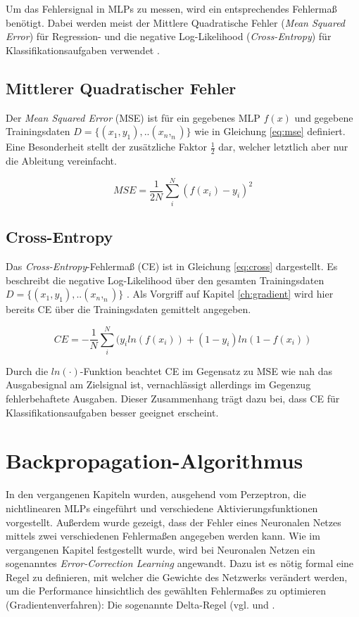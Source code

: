 Um das Fehlersignal in MLPs zu messen, wird ein entsprechendes Fehlermaß benötigt. Dabei werden meist der Mittlere Quadratische Fehler (\textit{Mean Squared Error}) für Regression- und die negative Log-Likelihood (\textit{Cross-Entropy}) für Klassifikationsaufgaben verwendet \cite[vgl.][]{Golik2013}. 

\subsection{Mittlerer Quadratischer Fehler}
Der \textit{Mean Squared Error} (MSE) ist für ein gegebenes MLP $f(x)$ und gegebene Trainingsdaten $D = \{(x_1,y_1),..(x_n,_n)\}$ wie in Gleichung \ref{eq:mse} definiert. Eine Besonderheit stellt der zusätzliche Faktor $\frac{1}{2}$ dar, welcher letztlich aber nur die Ableitung vereinfacht.

 	\begin{equation} 
 	\label{eq:mse}
   	MSE = \frac{1}{2N}\sum_{i}^{N}(f(x_i) - y_i)^2	
   	\end{equation}

\subsection{Cross-Entropy}
Das \textit{Cross-Entropy}-Fehlermaß (CE) ist in Gleichung \ref{eq:cross} dargestellt. Es beschreibt die negative Log-Likelihood über den gesamten Trainingsdaten $D = \{(x_1,y_1),..(x_n,_n)\}$ \cite[vgl.][S. 118]{Mitchell1997}. Als Vorgriff auf Kapitel \ref{ch:gradient} wird hier bereits CE über die Trainingsdaten gemittelt angegeben.

\begin{equation} 
 	\label{eq:cross}
   	CE = - \frac{1}{N}\sum_{i}^{N}(y_i ln(f(x_i)) + (1 - y_i) ln(1 - f(x_i))	
   	\end{equation}

Durch die $ln(\cdot)$-Funktion beachtet CE im Gegensatz zu MSE wie nah das Ausgabesignal am Zielsignal ist, vernachlässigt allerdings im Gegenzug fehlerbehaftete Ausgaben. Dieser Zusammenhang trägt dazu bei, dass CE für Klassifikationsaufgaben besser geeignet erscheint. 


\section{Backpropagation-Algorithmus}
\label{ch:backprop}
In den vergangenen Kapiteln wurden, ausgehend vom Perzeptron, die nichtlinearen MLPs eingeführt und verschiedene Aktivierungsfunktionen vorgestellt. Außerdem wurde gezeigt, dass der Fehler eines Neuronalen Netzes mittels zwei verschiedenen Fehlermaßen angegeben werden kann. Wie im vergangenen Kapitel festgestellt wurde, wird bei Neuronalen Netzen ein sogenanntes \textit{Error-Correction Learning} angewandt. Dazu ist es nötig formal eine Regel zu definieren, mit welcher die Gewichte des Netzwerks verändert werden, um die Performance hinsichtlich des gewählten Fehlermaßes zu optimieren (Gradientenverfahren): Die sogenannte Delta-Regel (vgl. \cite{Widrow1960} und \cite{Widrow1988}. 


